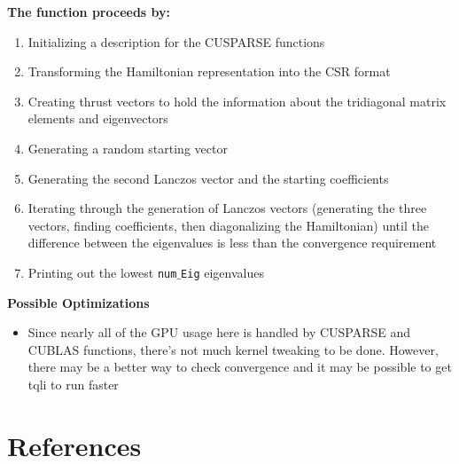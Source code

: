 \documentclass{article}
\begin{document}
\noindent\textbf{The function proceeds by:}
\begin{enumerate}
\item{Initializing a description for the CUSPARSE functions}
\item{Transforming the Hamiltonian representation into the CSR format}
\item{Creating thrust vectors to hold the information about the tridiagonal matrix elements and eigenvectors}
\item{Generating a random starting vector}
\item{Generating the second Lanczos vector and the starting coefficients}
\item{Iterating through the generation of Lanczos vectors (generating the three vectors, finding coefficients, then diagonalizing the Hamiltonian) until the difference between the eigenvalues is less than the convergence requirement}
\item{Printing out the lowest \texttt{num$\_$Eig} eigenvalues}
\end{enumerate}

\noindent\textbf{Possible Optimizations}
\begin{itemize}
\item{Since nearly all of the GPU usage here is handled by CUSPARSE and CUBLAS functions, there's not much kernel tweaking to be done. However, there may be a better way to check convergence and it may be possible to get tqli to run faster}
\end{itemize}

\section{References}
\end{document}
